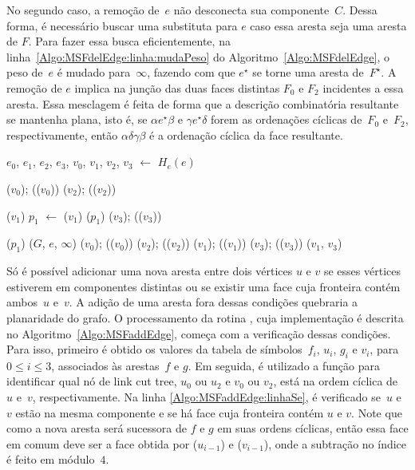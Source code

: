 No segundo caso, a remoção de~$e$ não desconecta sua componente~$C$.
Dessa forma, é necessário buscar uma substituta para $e$ caso essa aresta seja uma aresta de $F$.
Para fazer essa busca eficientemente, na linha~\ref{Algo:MSFdelEdge:linha:mudaPeso} do Algoritmo~\ref{Algo:MSFdelEdge}, o peso de~$e$ é mudado para~$\infty$, fazendo com que $e^\star$ se torne uma aresta de~$F^\star$. 
A remoção de $e$ implica na junção das duas faces distintas $F_0$ e $F_2$ incidentes a essa aresta.
Essa mesclagem é feita de forma que a descrição combinatória resultante se mantenha plana, isto é, se $\alpha e^\star \beta$ e $\gamma e^\star \delta$ forem as ordenações cíclicas de~$F_0$ e~$F_2$, respectivamente, então $\alpha \delta\gamma\beta$ é a ordenação cíclica da face resultante.

\begin{algorithm}[hbt]
\caption{\MSFdelEdge($G$, $e$)}
\label{Algo:MSFdelEdge}
\begin{algorithmic}[1]
\State $e_0$, $e_1$, $e_2$, $e_3$, $v_0$, $v_1$, $v_2$, $v_3$ $\gets$ $H_e(e)$
	\label{Algo:MSFdelEdge:linha2}

\State \LCOCycle($v_0$); \LCOSplit(\treapPredecessor($v_0$))\label{Algo:MSFdelEdge:linha3}
\State \LCOCycle($v_2$); \LCOSplit(\treapPredecessor($v_2$))

\State \LCOCycle($v_1$)
\State $p_1$ $\gets$ \treapPredecessor($v_1$)
\State \LCOSplit($p_1$)
\State \LCOCycle($v_3$); \LCOSplit(\treapPredecessor($v_3$))

\State \LCOSplit($p_1$) \label{Algo:MSFdelEdge:linha12}
\Else{}
\State \MSFupdate($G$, $e$, $\infty$)\label{Algo:MSFdelEdge:linha:mudaPeso}
\State \LCOCycle($v_0$); \LCOSplit(\treapPredecessor($v_0$))
\State \LCOCycle($v_2$); \LCOSplit(\treapPredecessor($v_2$))
\State \LCOCycle($v_1$); \LCOSplit(\treapPredecessor($v_1$))
\State \LCOCycle($v_3$); \LCOSplit(\treapPredecessor($v_3$))
\State \LCOMerge($v_1$, $v_3$)
\EndIf
\end{algorithmic}
\end{algorithm}


Só é possível adicionar uma nova aresta entre dois vértices $u$ e $v$ se esses vértices estiverem em componentes distintas ou se existir uma face cuja fronteira contém ambos~$u$ e~$v$.
A adição de uma aresta fora dessas condições quebraria a planaridade do grafo. 
O processamento da rotina \MSFaddEdge{}, cuja implementação é descrita no Algoritmo~\ref{Algo:MSFaddEdge}, começa com a verificação dessas condições.
Para isso, primeiro é obtido os valores da tabela de símbolos~$f_i$, $u_i$, $g_i$ e $v_i$, para $0\leq i \leq 3$, associados às arestas~$f$ e $g$.
Em seguida, é utilizado a função \LCOFindNode{} para identificar qual nó de link cut tree, $u_0$ ou $u_2$ e $v_0$ ou $v_2$, está na ordem cíclica de~$u$ e~$v$, respectivamente.
Na linha \ref{Algo:MSFaddEdge:linhaSe}, é verificado se~$u$ e~$v$ estão na mesma componente e se há face cuja fronteira contém $u$ e $v$.
Note que como a nova aresta será sucessora de $f$ e $g$ em suas ordens cíclicas, então essa face em comum deve ser a face obtida por \LCOFindNode($u_{i-1}$) e \LCOFindNode($v_{i-1}$), onde a subtração no índice é feito em módulo~$4$.

